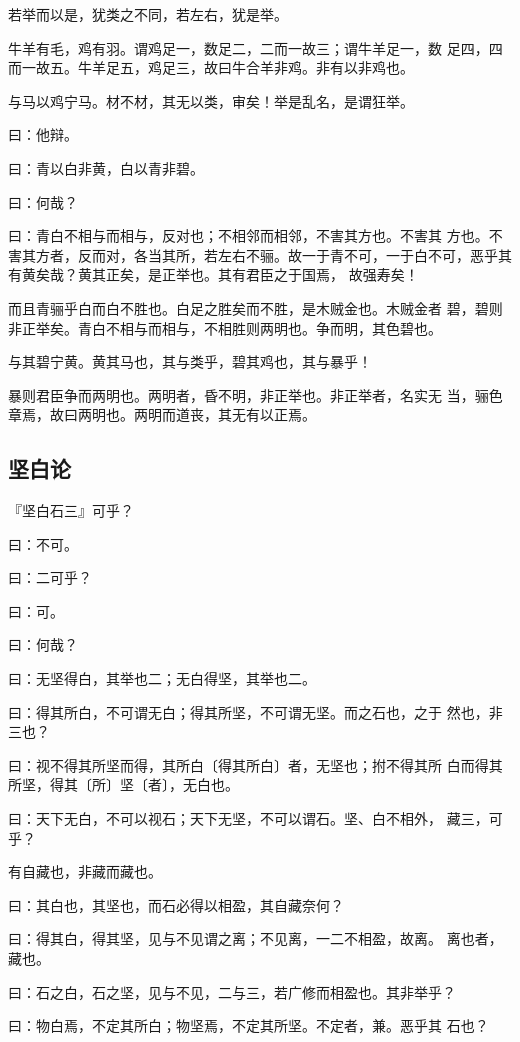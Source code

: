 \documentclass[]{article}
\begin{document}
若举而以是，犹类之不同，若左右，犹是举。

牛羊有毛，鸡有羽。谓鸡足一，数足二，二而一故三；谓牛羊足一，数
足四，四而一故五。牛羊足五，鸡足三，故曰牛合羊非鸡。非有以非鸡也。

与马以鸡宁马。材不材，其无以类，审矣！举是乱名，是谓狂举。

曰：他辩。

曰：青以白非黄，白以青非碧。

曰：何哉？

曰：青白不相与而相与，反对也；不相邻而相邻，不害其方也。不害其
方也。不害其方者，反而对，各当其所，若左右不骊。故一于青不可，一于白不可，恶乎其有黄矣哉？黄其正矣，是正举也。其有君臣之于国焉，
故强寿矣！

而且青骊乎白而白不胜也。白足之胜矣而不胜，是木贼金也。木贼金者
碧，碧则非正举矣。青白不相与而相与，不相胜则两明也。争而明，其色碧也。

与其碧宁黄。黄其马也，其与类乎，碧其鸡也，其与暴乎！

暴则君臣争而两明也。两明者，昏不明，非正举也。非正举者，名实无
当，骊色章焉，故曰两明也。两明而道丧，其无有以正焉。

\hypertarget{header-n17}{%
\subsection{坚白论}\label{header-n17}}

『坚白石三』可乎？

曰：不可。

曰：二可乎？

曰：可。

曰：何哉？

曰：无坚得白，其举也二；无白得坚，其举也二。

曰：得其所白，不可谓无白；得其所坚，不可谓无坚。而之石也，之于
然也，非三也？

曰：视不得其所坚而得，其所白〔得其所白〕者，无坚也；拊不得其所
白而得其所坚，得其〔所〕坚〔者〕，无白也。

曰：天下无白，不可以视石；天下无坚，不可以谓石。坚、白不相外，
藏三，可乎？

有自藏也，非藏而藏也。

曰：其白也，其坚也，而石必得以相盈，其自藏奈何？

曰：得其白，得其坚，见与不见谓之离；不见离，一二不相盈，故离。
离也者，藏也。

曰：石之白，石之坚，见与不见，二与三，若广修而相盈也。其非举乎？

曰：物白焉，不定其所白；物坚焉，不定其所坚。不定者，兼。恶乎其 石也？
\end{document}
